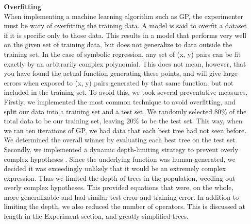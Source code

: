\textbf{Overfitting}\\
When implementing a machine learning algorithm such as GP, the experimenter must be wary of overfitting the training data. A model is said to overfit a dataset if it is specific only to those data. This results in a model that performs very well on the given set of training data, but does not generalize to data outside the training set. In the case of symbolic regression, any set of (x, y) pairs can be fit exactly by an arbitrarily complex polynomial. This does not mean, however, that you have found the actual function generating these points, and will give large errors when exposed to (x, y) pairs generated by that same function, but not included in the training set. To avoid this, we took several preventative measures. \\
Firstly, we implemented the most common technique to avoid overfitting, and split our data into a training set and a test set. We randomly selected 80\% of the total data to be our training set, leaving 20\% to be the test set. This way, when we ran ten iterations of GP, we had data that each best tree had not seen before. We determined the overall winner by evaluating each best tree on the test set.\\
Secondly, we implemented a dynamic depth-limiting strategy to prevent
overly complex hypotheses \cite{Overfitting}.  Since the underlying function was human-generated, we decided it was exceedingly unlikely that it would be an extremely complex expression. Thus we limited the depth of trees in the population, weeding out overly complex hypotheses. This provided equations that were, on the whole, more generalizable and had similar test error and training error. In addition to limiting the depth, we also reduced the number of operators. This is discussed at length in the Experiment section, and greatly simplified trees.\\